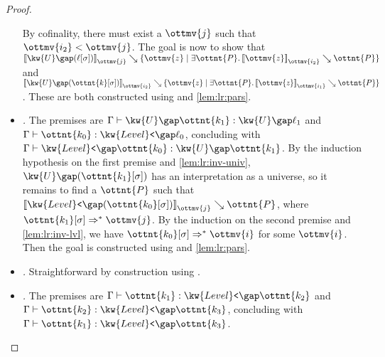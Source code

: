 \documentclass[a4paper,UKenglish,cleveref,autoref,thm-restate]{lipics-v2021}
\begin{document}
\begin{proof}
\begin{itemize}[topsep=0pt]
      By cofinality, there must exist a $\ottmv{j}$ such that $ \ottmv{i_{{\mathrm{2}}}}  <  \ottmv{j} $.
      The goal is now to show that $ \mathopen{\llbracket}   \kw{U} \gap   (  \ell [  \sigma  ]  )    \mathclose{\rrbracket}_{ \ottmv{j} } \searrow   \lbrace  \ottmv{z}  \mid   \exists  \ottnt{P}  \mathpunct{.}   \mathopen{\llbracket}   \mathit{ \ottmv{z} }   \mathclose{\rrbracket}_{ \ottmv{i_{{\mathrm{2}}}} } \searrow  \ottnt{P}    \rbrace  $
      and $ \mathopen{\llbracket}   \kw{U} \gap   (  \ottnt{k} [  \sigma  ]  )    \mathclose{\rrbracket}_{ \ottmv{i_{{\mathrm{2}}}} } \searrow   \lbrace  \ottmv{z}  \mid   \exists  \ottnt{P}  \mathpunct{.}   \mathopen{\llbracket}   \mathit{ \ottmv{z} }   \mathclose{\rrbracket}_{ \ottmv{i_{{\mathrm{1}}}} } \searrow  \ottnt{P}    \rbrace  $.
      These are both constructed using  and \cref{lem:lr:pars}.
    \item \textit{.}
      The premises are $ \Gamma  \vdash   \kw{U} \gap  \ottnt{k_{{\mathrm{1}}}}   \mathrel{:}   \kw{U} \gap  \ell_{{\mathrm{1}}}  $ and $ \Gamma  \vdash  \ottnt{k_{{\mathrm{0}}}}  \mathrel{:}   \kw{Level}\texttt{<} \gap  \ell_{{\mathrm{0}}}  $,
      concluding with $ \Gamma  \vdash   \kw{Level}\texttt{<} \gap  \ottnt{k_{{\mathrm{0}}}}   \mathrel{:}   \kw{U} \gap  \ottnt{k_{{\mathrm{1}}}}  $.
      By the induction hypothesis on the first premise and \cref{lem:lr:inv-univ},
      $ \kw{U} \gap   (  \ottnt{k_{{\mathrm{1}}}} [  \sigma  ]  )  $ has an interpretation as a universe,
      so it remains to find a $\ottnt{P}$ such that $ \mathopen{\llbracket}   \kw{Level}\texttt{<} \gap   (  \ottnt{k_{{\mathrm{0}}}} [  \sigma  ]  )    \mathclose{\rrbracket}_{ \ottmv{j} } \searrow  \ottnt{P} $,
      where $  \ottnt{k_{{\mathrm{1}}}} [  \sigma  ]   \Rightarrow^\ast   \ottmv{j}  $.
      By the induction on the second premise and \cref{lem:lr:inv-lvl},
      we have $  \ottnt{k_{{\mathrm{0}}}} [  \sigma  ]   \Rightarrow^\ast   \ottmv{i}  $ for some $\ottmv{i}$.
      Then the goal is constructed using  and \cref{lem:lr:pars}.
    \item \textit{.} Straightforward by construction using .
    \item \textit{.}
      The premises are $ \Gamma  \vdash  \ottnt{k_{{\mathrm{1}}}}  \mathrel{:}   \kw{Level}\texttt{<} \gap  \ottnt{k_{{\mathrm{2}}}}  $ and $ \Gamma  \vdash  \ottnt{k_{{\mathrm{2}}}}  \mathrel{:}   \kw{Level}\texttt{<} \gap  \ottnt{k_{{\mathrm{3}}}}  $,
      concluding with $ \Gamma  \vdash  \ottnt{k_{{\mathrm{1}}}}  \mathrel{:}   \kw{Level}\texttt{<} \gap  \ottnt{k_{{\mathrm{3}}}}  $.

\end{itemize}
\end{proof}
\end{document}
